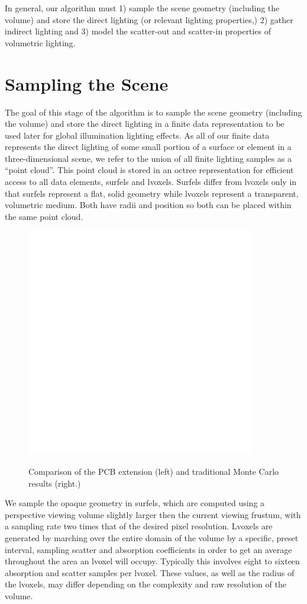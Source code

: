 \documentclass[12pt]{ucthesis}
\newcommand{\captionfonts}{\small\bf\ssp}
\begin{document}
In general, our algorithm must 1) sample the scene geometry (including the volume) and store the direct lighting (or relevant lighting properties,) 2) gather indirect lighting and 3) model the scatter-out and scatter-in properties of volumetric lighting.

\section{Sampling the Scene}
The goal of this stage of the algorithm is to sample the scene geometry (including the volume) and store the direct lighting in a finite data representation to be used later for global illumination lighting effects.  As all of our finite data represents the direct lighting of some small portion of a surface or element in a three-dimensional scene, we refer to the union of all finite lighting samples as a ``point cloud''.  This point cloud is stored in an octree representation for efficient access to all data elements, surfels and lvoxels.  Surfels differ from lvoxels only in that surfels represent a flat, solid geometry while lvoxels represent a transparent, volumetric medium.  Both have radii and position so both can be placed within the same point cloud.  

\begin{figure}[h!]
    \centering
    \includegraphics[width=100mm]{img/diag/surfel_samp.pdf}
    \captionfonts
    \caption{Comparison of the PCB extension (left) and traditional Monte Carlo results (right.)}
    \label{fig:phase}
\end{figure}

We sample the opaque geometry in surfels, which are computed using a perspective viewing volume slightly larger then the current viewing frustum, with a sampling rate two times that of the desired pixel resolution.  Lvoxels are generated by marching over the entire domain of the volume by a specific, preset interval, sampling scatter and absorption coefficients in order to get an average throughout the area an lvoxel will occupy.  Typically this involves eight to sixteen absorption and scatter samples per lvoxel.  These values, as well as the radius of the lvoxels, may differ depending on the complexity and raw resolution of the volume.
\end{document}
